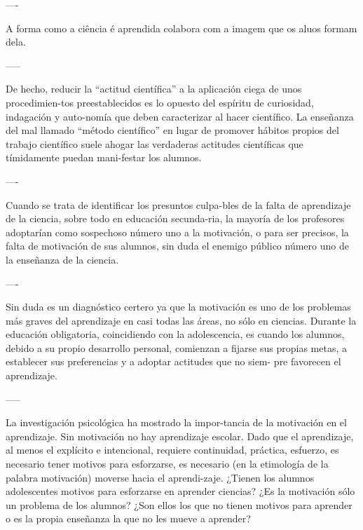 

----

A forma como a ciência é aprendida colabora com a imagem que os aluos formam dela.

-----

De hecho, reducir la “actitud científica” a la aplicación ciega de unos procedimien-tos preestablecidos es lo opuesto del espíritu de curiosidad, indagación y auto-nomía que deben caracterizar al hacer científico. La enseñanza del mal llamado “método científico” en lugar de promover hábitos propios del trabajo científico suele ahogar las verdaderas actitudes científicas que tímidamente puedan mani-festar los alumnos.

----

Cuando se trata de identificar los presuntos culpa-bles de la falta de aprendizaje de la ciencia, sobre todo en educación secunda-ria, la mayoría de los profesores adoptarían como sospechoso número uno a la motivación, o para ser precisos, la falta de motivación de sus alumnos, sin duda el enemigo público número uno de la enseñanza de la ciencia.

----

Sin duda es un diagnóstico certero ya que la motivación es uno de los problemas más graves del aprendizaje en casi todas las áreas, no sólo en ciencias. Durante la educación obligatoria, coincidiendo con la adolescencia, es cuando los alumnos, debido a su propio desarrollo personal, comienzan a fijarse sus propias metas, a establecer sus preferencias y a adoptar actitudes que no siem- pre favorecen el aprendizaje.

-----

La investigación psicológica ha mostrado la impor-tancia de la motivación en el aprendizaje. Sin motivación no hay aprendizaje escolar. Dado que el aprendizaje, al menos el explícito e intencional, requiere continuidad, práctica, esfuerzo, es necesario tener motivos para esforzarse, es necesario (en la etimología de la palabra motivación) moverse hacia el aprendi-zaje. ¿Tienen los alumnos adolescentes motivos para esforzarse en aprender ciencias? ¿Es la motivación sólo un problema de los alumnos? ¿Son ellos los que no tienen motivos para aprender o es la propia enseñanza la que no les mueve a aprender?

